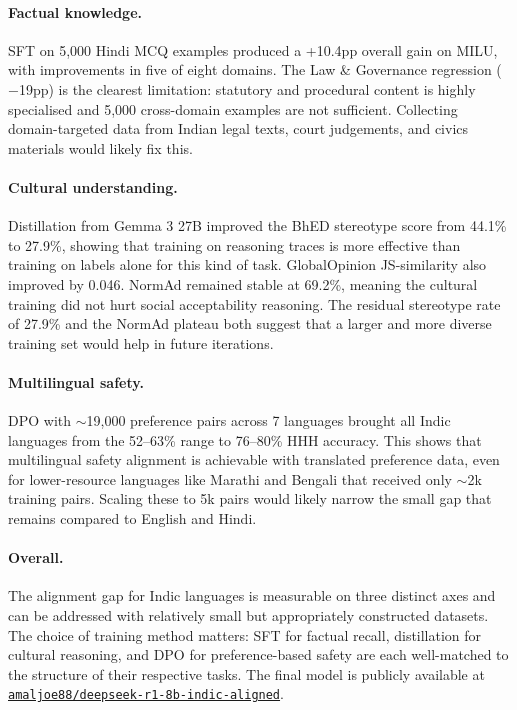 \documentclass[12pt,a4paper]{article}
\begin{document}
\paragraph{Factual knowledge.}
SFT on 5,000 Hindi MCQ examples produced a +10.4pp overall gain on MILU, with improvements in five of eight domains. The Law \& Governance regression ($-$19pp) is the clearest limitation: statutory and procedural content is highly specialised and 5,000 cross-domain examples are not sufficient. Collecting domain-targeted data from Indian legal texts, court judgements, and civics materials would likely fix this.

\paragraph{Cultural understanding.}
Distillation from Gemma 3 27B improved the BhED stereotype score from 44.1\% to 27.9\%, showing that training on reasoning traces is more effective than training on labels alone for this kind of task. GlobalOpinion JS-similarity also improved by 0.046. NormAd remained stable at 69.2\%, meaning the cultural training did not hurt social acceptability reasoning. The residual stereotype rate of 27.9\% and the NormAd plateau both suggest that a larger and more diverse training set would help in future iterations.

\paragraph{Multilingual safety.}
DPO with $\sim$19,000 preference pairs across 7 languages brought all Indic languages from the 52--63\% range to 76--80\% HHH accuracy. This shows that multilingual safety alignment is achievable with translated preference data, even for lower-resource languages like Marathi and Bengali that received only $\sim$2k training pairs. Scaling these to 5k pairs would likely narrow the small gap that remains compared to English and Hindi.

\paragraph{Overall.}
The alignment gap for Indic languages is measurable on three distinct axes and can be addressed with relatively small but appropriately constructed datasets. The choice of training method matters: SFT for factual recall, distillation for cultural reasoning, and DPO for preference-based safety are each well-matched to the structure of their respective tasks. The final model is publicly available at \href{https://huggingface.co/amaljoe88/deepseek-r1-8b-indic-aligned}{\texttt{amaljoe88/deepseek-r1-8b-indic-aligned}}.
\end{document}
